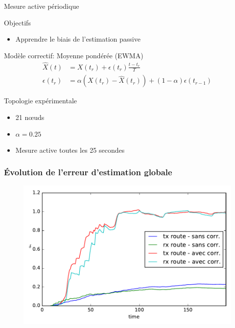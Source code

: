 \begin{frame}{Mesure active périodique}
  \begin{block}{Objectifs}
    \begin{itemize}
      \item Apprendre le biais de l'estimation passive
    \end{itemize}
  \end{block}
  \begin{alertblock}{Modèle correctif: Moyenne pondérée (EWMA)}
    \begin{align}
      \widehat{X}(t) &= X(t_r) + \epsilon(t_r)\frac{t - t_r}{T}\\
      \epsilon(t_r) &= \alpha (X(t_r) - \widehat{X}(t_r)) + (1 - \alpha)\epsilon(t_{r-1})
      \label{supervision:eqn:bias}
    \end{align}
  \end{alertblock}
  \begin{block}{Topologie expérimentale}
    \begin{itemize}
      \item 21 nœuds
      \item $\alpha = 0.25$
      \item Mesure active toutes les 25 secondes
    \end{itemize}
  \end{block}
\end{frame}

\begin{frame}\frametitle{Évolution de l'erreur d'estimation globale}
  \begin{figure}[ht]
    \centering
    \includegraphics[width=\textwidth]{figures/mesure_active.pdf}
  \end{figure}
\end{frame}


